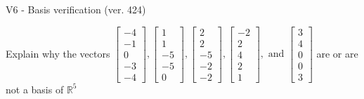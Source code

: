 \begin{exercise}
  \begin{exerciseTitle}V6 - Basis verification (ver. 424)\end{exerciseTitle}
  \begin{exerciseStatement}
    Explain why the vectors \(\left[\begin{array}{r}
-4 \\
-1 \\
0 \\
-3 \\
-4
\end{array}\right] , \left[\begin{array}{r}
1 \\
1 \\
-5 \\
-5 \\
0
\end{array}\right] , \left[\begin{array}{r}
2 \\
2 \\
-5 \\
-2 \\
-2
\end{array}\right] , \left[\begin{array}{r}
-2 \\
2 \\
4 \\
2 \\
1
\end{array}\right] , \text{ and } \left[\begin{array}{r}
3 \\
4 \\
0 \\
0 \\
3
\end{array}\right]\) are or are not a basis of \(\mathbb{R}^5\)	



\end{exerciseStatement}
\end{exercise}

